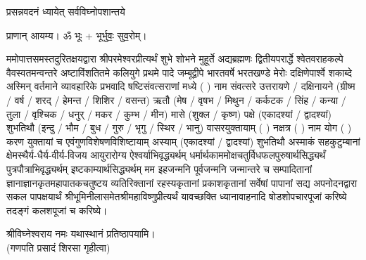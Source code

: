 
\setlength{\parindent}{0pt}




{प्रसन्नवदनं ध्यायेत् सर्वविघ्नोपशान्तये}
 
प्राणान्  आयम्य।  ॐ भूः + भूर्भुवः॒ सुव॒रोम्।


ममोपात्तसमस्तदुरितक्षयद्वारा श्रीपरमेश्वरप्रीत्यर्थं शुभे शोभने मुहूर्ते अद्यब्रह्मणः
द्वितीयपरार्द्धे श्वेतवराहकल्पे वैवस्वतमन्वन्तरे अष्टाविंशतितमे कलियुगे प्रथमे पादे
जम्बूद्वीपे भारतवर्षे भरतखण्डे मेरोः दक्षिणेपार्श्वे शकाब्दे अस्मिन् वर्तमाने व्यावहारिके
 प्रभवादि षष्टिसंवत्सराणां मध्ये (	) नाम संवत्सरे उत्तरायणे / दक्षिनायने 
(ग्रीष्म / वर्ष / शरद् / हेमन्त / शिशिर / वसन्त) ऋतौ  (मेष / वृषभ / मिथुन / कर्कटक / सिंह / कन्या / तुला / 
वृश्चिक / धनुर् / मकर / कुम्भ / मीन) मासे (शुक्ल / कृष्ण) पक्षे (एकादश्यां / द्वादश्यां) शुभतिथौ
(इन्दु / भौम / बुध / गुरु / भृगु / स्थिर / भानु) वासरयुक्तायाम्
(  ) नक्षत्र (  ) नाम  योग  (  ) करण युक्तायां च एवं\-गुण\-विशेषण\-विशिष्टायाम्
अस्याम् (एकादश्यां / द्वादश्यां) शुभतिथौ 
अस्माकं सहकुटुम्बानां क्षेमस्थैर्य-धैर्य-वीर्य-विजय आयुरारोग्य ऐश्वर्याभिवृद्ध्यर्थम्
 धर्मार्थकाममोक्ष\-चतुर्विधफलपुरुषार्थसिद्ध्यर्थं पुत्रपौत्राभि\-वृद्ध्यर्थम् इष्टकाम्यार्थसिद्ध्यर्थम्
मम इहजन्मनि पूर्वजन्मनि जन्मान्तरे च सम्पादितानां ज्ञानाज्ञानकृतमहा\-पातकचतुष्टय
व्यतिरिक्तानां रहस्यकृतानां प्रकाशकृतानां सर्वेषां पापानां सद्य अपनोदनद्वारा सकल 
पापक्षयार्थं श्रीभूमिनीलासमेतश्रीमहाविष्णुप्रीत्यर्थं यावच्छक्ति ध्यानावाहनादि 
षोडशोपचारपूजां करिष्ये तदङ्गं कलशपूजां च करिष्ये।


श्रीविघ्नेश्वराय नमः यथास्थानं प्रतिष्ठापयामि।\\
(गणपति प्रसादं शिरसा गृहीत्वा)

\renewcommand{\devaName}{विष्णु}












